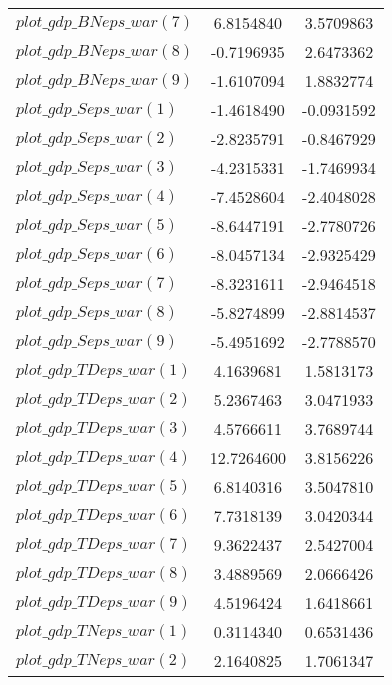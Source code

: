 \begin{center}
\begin{longtable}{lcc}
$plot\_gdp\_BN eps\_war (7)  $	 & 	      6.8154840	 & 	      3.5709863 \\ 
$plot\_gdp\_BN eps\_war (8)  $	 & 	     -0.7196935	 & 	      2.6473362 \\ 
$plot\_gdp\_BN eps\_war (9)  $	 & 	     -1.6107094	 & 	      1.8832774 \\ 
$plot\_gdp\_S eps\_war (1)   $	 & 	     -1.4618490	 & 	     -0.0931592 \\ 
$plot\_gdp\_S eps\_war (2)   $	 & 	     -2.8235791	 & 	     -0.8467929 \\ 
$plot\_gdp\_S eps\_war (3)   $	 & 	     -4.2315331	 & 	     -1.7469934 \\ 
$plot\_gdp\_S eps\_war (4)   $	 & 	     -7.4528604	 & 	     -2.4048028 \\ 
$plot\_gdp\_S eps\_war (5)   $	 & 	     -8.6447191	 & 	     -2.7780726 \\ 
$plot\_gdp\_S eps\_war (6)   $	 & 	     -8.0457134	 & 	     -2.9325429 \\ 
$plot\_gdp\_S eps\_war (7)   $	 & 	     -8.3231611	 & 	     -2.9464518 \\ 
$plot\_gdp\_S eps\_war (8)   $	 & 	     -5.8274899	 & 	     -2.8814537 \\ 
$plot\_gdp\_S eps\_war (9)   $	 & 	     -5.4951692	 & 	     -2.7788570 \\ 
$plot\_gdp\_TD eps\_war (1)  $	 & 	      4.1639681	 & 	      1.5813173 \\ 
$plot\_gdp\_TD eps\_war (2)  $	 & 	      5.2367463	 & 	      3.0471933 \\ 
$plot\_gdp\_TD eps\_war (3)  $	 & 	      4.5766611	 & 	      3.7689744 \\ 
$plot\_gdp\_TD eps\_war (4)  $	 & 	     12.7264600	 & 	      3.8156226 \\ 
$plot\_gdp\_TD eps\_war (5)  $	 & 	      6.8140316	 & 	      3.5047810 \\ 
$plot\_gdp\_TD eps\_war (6)  $	 & 	      7.7318139	 & 	      3.0420344 \\ 
$plot\_gdp\_TD eps\_war (7)  $	 & 	      9.3622437	 & 	      2.5427004 \\ 
$plot\_gdp\_TD eps\_war (8)  $	 & 	      3.4889569	 & 	      2.0666426 \\ 
$plot\_gdp\_TD eps\_war (9)  $	 & 	      4.5196424	 & 	      1.6418661 \\ 
$plot\_gdp\_TN eps\_war (1)  $	 & 	      0.3114340	 & 	      0.6531436 \\ 
$plot\_gdp\_TN eps\_war (2)  $	 & 	      2.1640825	 & 	      1.7061347 \\ 

\end{longtable}
\end{center}
